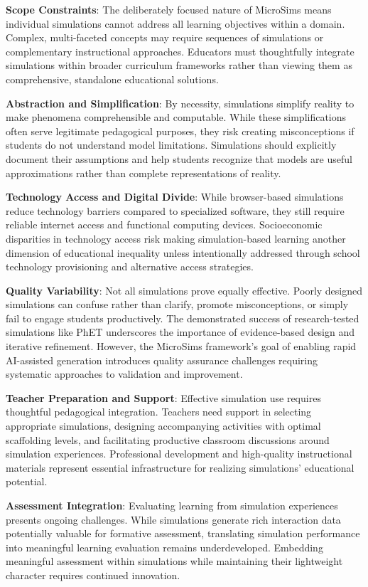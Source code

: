 \textbf{Scope Constraints}: The deliberately focused nature of MicroSims means individual simulations cannot address all learning objectives within a domain. Complex, multi-faceted concepts may require sequences of simulations or complementary instructional approaches. Educators must thoughtfully integrate simulations within broader curriculum frameworks rather than viewing them as comprehensive, standalone educational solutions.

\textbf{Abstraction and Simplification}: By necessity, simulations simplify reality to make phenomena comprehensible and computable. While these simplifications often serve legitimate pedagogical purposes, they risk creating misconceptions if students do not understand model limitations. Simulations should explicitly document their assumptions and help students recognize that models are useful approximations rather than complete representations of reality.

\textbf{Technology Access and Digital Divide}: While browser-based simulations reduce technology barriers compared to specialized software, they still require reliable internet access and functional computing devices. Socioeconomic disparities in technology access risk making simulation-based learning another dimension of educational inequality unless intentionally addressed through school technology provisioning and alternative access strategies.

\textbf{Quality Variability}: Not all simulations prove equally effective. Poorly designed simulations can confuse rather than clarify, promote misconceptions, or simply fail to engage students productively. The demonstrated success of research-tested simulations like PhET underscores the importance of evidence-based design and iterative refinement. However, the MicroSims framework's goal of enabling rapid AI-assisted generation introduces quality assurance challenges requiring systematic approaches to validation and improvement.

\textbf{Teacher Preparation and Support}: Effective simulation use requires thoughtful pedagogical integration. Teachers need support in selecting appropriate simulations, designing accompanying activities with optimal scaffolding levels, and facilitating productive classroom discussions around simulation experiences. Professional development and high-quality instructional materials represent essential infrastructure for realizing simulations' educational potential.

\textbf{Assessment Integration}: Evaluating learning from simulation experiences presents ongoing challenges. While simulations generate rich interaction data potentially valuable for formative assessment, translating simulation performance into meaningful learning evaluation remains underdeveloped. Embedding meaningful assessment within simulations while maintaining their lightweight character requires continued innovation.

